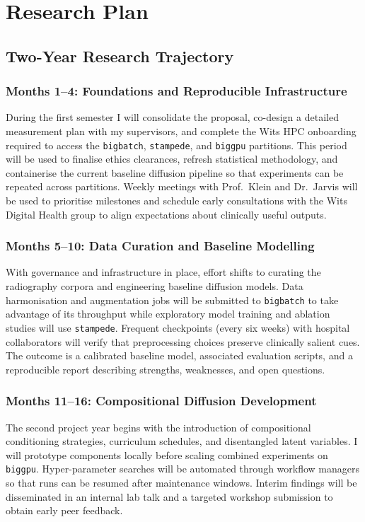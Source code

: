 \chapter{Research Plan}
\section{Two-Year Research Trajectory}
\subsection{Months 1--4: Foundations and Reproducible Infrastructure}
During the first semester I will consolidate the proposal, co-design a detailed measurement plan with my supervisors, and complete the Wits HPC onboarding required to access the \texttt{bigbatch}, \texttt{stampede}, and \texttt{biggpu} partitions. This period will be used to finalise ethics clearances, refresh statistical methodology, and containerise the current baseline diffusion pipeline so that experiments can be repeated across partitions. Weekly meetings with Prof.~Klein and Dr.~Jarvis will be used to prioritise milestones and schedule early consultations with the Wits Digital Health group to align expectations about clinically useful outputs.
\subsection{Months 5--10: Data Curation and Baseline Modelling}
With governance and infrastructure in place, effort shifts to curating the radiography corpora and engineering baseline diffusion models. Data harmonisation and augmentation jobs will be submitted to \texttt{bigbatch} to take advantage of its throughput while exploratory model training and ablation studies will use \texttt{stampede}. Frequent checkpoints (every six weeks) with hospital collaborators will verify that preprocessing choices preserve clinically salient cues. The outcome is a calibrated baseline model, associated evaluation scripts, and a reproducible report describing strengths, weaknesses, and open questions.
\subsection{Months 11--16: Compositional Diffusion Development}
The second project year begins with the introduction of compositional conditioning strategies, curriculum schedules, and disentangled latent variables. I will prototype components locally before scaling combined experiments on \texttt{biggpu}. Hyper-parameter searches will be automated through workflow managers so that runs can be resumed after maintenance windows. Interim findings will be disseminated in an internal lab talk and a targeted workshop submission to obtain early peer feedback.
